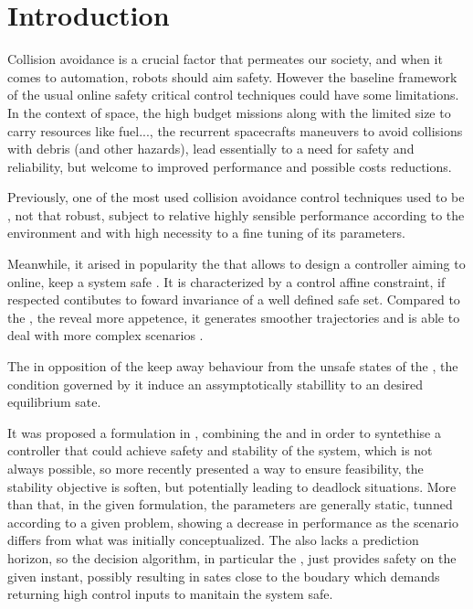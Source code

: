 
%

\chapter{Introduction}
\label{cha:introduction}

Collision avoidance is a crucial factor that permeates our society, and when it comes to automation, robots should aim safety. However the baseline framework of the usual online safety critical control techniques could have some limitations. In the context of space, the high budget missions along with the limited size to carry resources like fuel..., the recurrent spacecrafts maneuvers to avoid collisions with debris \cite{hall2014history} (and other hazards), lead essentially to a need for safety and reliability, but welcome to improved performance and possible costs reductions.  

Previously, one of the most used collision avoidance control techniques used to be  \cite{khatib1986real}, not that robust, subject to relative  highly sensible performance according to the environment and with high necessity to a fine tuning of its parameters. 

Meanwhile, it arised in popularity the  that allows to design a controller aiming to online, keep a system safe \cite{ames2019control}. It is characterized by a control affine constraint, if respected contibutes to foward invariance of a well defined safe set. Compared to the , the  reveal more appetence, it generates smoother trajectories and is able to deal with more complex scenarios \cite{singletary2021comparative}.

The  \cite{ames2014rapidly} in opposition of the keep away behaviour from the unsafe states of the , the condition governed by it induce an assymptotically stabillity to an desired equilibrium sate. 

It was proposed a  formulation in \cite{ames2014control}, combining the  and  in order to syntethise a controller that could achieve safety and stability of the system, which is not always possible, so more recently \cite{ames2019control} presented a way to ensure feasibility, the stability objective is soften, but potentially leading to deadlock situations. More than that, in the given formulation, the  parameters are generally static, tunned according to a given problem, showing a decrease in performance as the scenario differs from what was initially conceptualized. The  also lacks a prediction horizon, so the decision algorithm, in particular the , just provides safety on the given instant, possibly resulting in sates close to the boudary which demands returning high control inputs to manitain the system safe.


